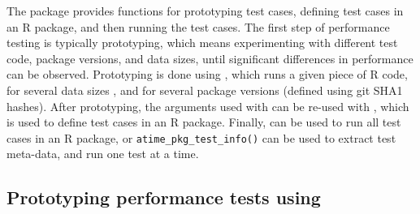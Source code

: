 The  package provides functions for prototyping test cases, defining test cases in an R package, and then running the test cases.
The first step of performance testing is typically prototyping, which means experimenting with different test code, package versions, and data sizes, until significant differences in performance can be observed. 
Prototyping is done using , which runs a given piece of R code, for several data sizes , and for several package versions (defined using git SHA1 hashes).
After prototyping, the arguments used with  can be re-used with , which is used to define test cases in an R package.
Finally,  can be used to run all test cases in an R package, or \verb|atime_pkg_test_info()| can be used to extract test meta-data, and run one test at a time.

\subsection{Prototyping performance tests using }

